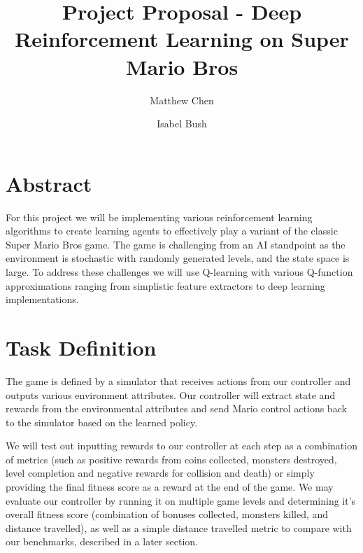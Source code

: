 \documentclass[12pt]{article}
\begin{document}
\nocite{*}

\title{Project Proposal - Deep Reinforcement Learning on Super Mario Bros}

\author{
  Matthew Chen
  \and
  Isabel Bush
}
\date{}
\maketitle


\section{Abstract}

For this project we will be implementing various reinforcement learning algorithms to create learning agents to effectively play a variant of the classic Super Mario Bros game. The game is challenging from an AI standpoint as the environment is stochastic with randomly generated levels, and the state space is large. To address these challenges we will use Q-learning with various Q-function approximations ranging from simplistic feature extractors to deep learning implementations.

\section{Task Definition}

The game is defined by a simulator that receives actions from our controller and outputs various environment attributes. Our controller will extract state and rewards from the environmental attributes and send Mario control actions back to the simulator based on the learned policy. 

We will test out inputting rewards to our controller at each step as a combination of metrics (such as positive rewards from coins collected, monsters destroyed, level completion and negative rewards for collision and death) or simply providing the final fitness score as a reward at the end of the game. We may evaluate our controller by running it on multiple game levels and determining it's overall fitness score (combination of bonuses collected, monsters killed, and distance travelled), as well as a simple distance travelled metric to compare with our benchmarks, described in a later section.
\end{document}
